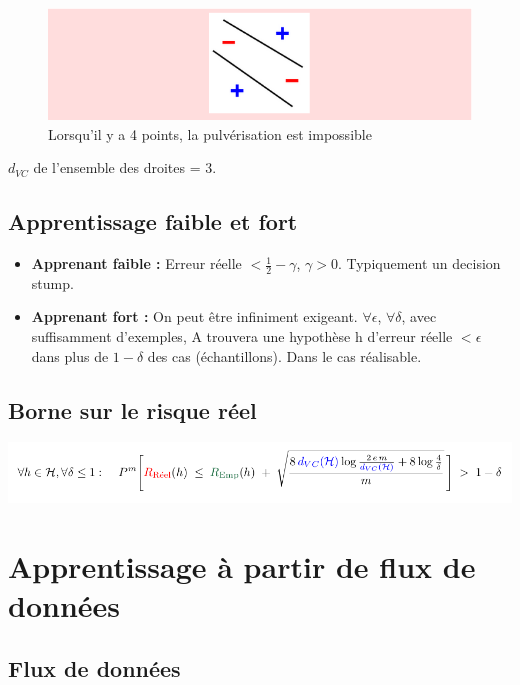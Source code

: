 \documentclass{article}
\begin{document}
\begin{figure}[H]
  \centering
  \includegraphics[scale=0.4]{dimension_vc2.png}
  \caption{Lorsqu'il y a 4 points, la pulvérisation est impossible}
\end{figure}

$d_{VC}$ de l'ensemble des droites = 3.

\subsection{Apprentissage faible et fort}

\begin{itemize}
\item \textbf{Apprenant faible :} Erreur réelle $< \frac{1}{2} - \gamma$, $\gamma > 0$. Typiquement un decision stump.
\item \textbf{Apprenant fort :} On peut être infiniment exigeant. $\forall \epsilon$, $\forall \delta$, avec suffisamment d'exemples, A trouvera une hypothèse h d'erreur réelle $< \epsilon$ dans plus de $1 - \delta$ des cas (échantillons). Dans le cas réalisable.
\end{itemize}

\subsection{Borne sur le risque réel}

\includegraphics[scale=0.4]{risk_bound.png}

\section{Apprentissage à partir de flux de données}

\subsection{Flux de données}
\end{document}
